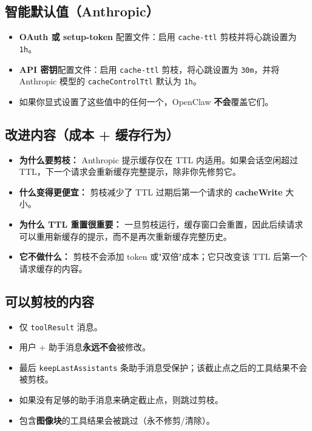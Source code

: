 \subsection{智能默认值（Anthropic）}


\begin{itemize}
  \item \textbf{OAuth 或 setup-token} 配置文件：启用 \texttt{cache-ttl} 剪枝并将心跳设置为 \texttt{1h}。
  \item \textbf{API 密钥}配置文件：启用 \texttt{cache-ttl} 剪枝，将心跳设置为 \texttt{30m}，并将 Anthropic 模型的 \texttt{cacheControlTtl} 默认为 \texttt{1h}。
  \item 如果你显式设置了这些值中的任何一个，OpenClaw \textbf{不会}覆盖它们。
\end{itemize}


\subsection{改进内容（成本 + 缓存行为）}


\begin{itemize}
  \item \textbf{为什么要剪枝：} Anthropic 提示缓存仅在 TTL 内适用。如果会话空闲超过 TTL，下一个请求会重新缓存完整提示，除非你先修剪它。
  \item \textbf{什么变得更便宜：} 剪枝减少了 TTL 过期后第一个请求的 \textbf{cacheWrite} 大小。
  \item \textbf{为什么 TTL 重置很重要：} 一旦剪枝运行，缓存窗口会重置，因此后续请求可以重用新缓存的提示，而不是再次重新缓存完整历史。
  \item \textbf{它不做什么：} 剪枝不会添加 token 或"双倍"成本；它只改变该 TTL 后第一个请求缓存的内容。
\end{itemize}


\subsection{可以剪枝的内容}


\begin{itemize}
  \item 仅 \texttt{toolResult} 消息。
  \item 用户 + 助手消息\textbf{永远不会}被修改。
  \item 最后 \texttt{keepLastAssistants} 条助手消息受保护；该截止点之后的工具结果不会被剪枝。
  \item 如果没有足够的助手消息来确定截止点，则跳过剪枝。
  \item 包含\textbf{图像块}的工具结果会被跳过（永不修剪/清除）。
\end{itemize}


